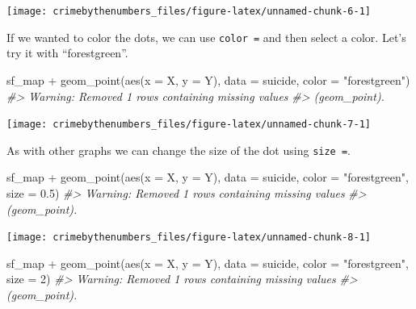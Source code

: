 \documentclass[
]{krantz}
\makeatletter
\newenvironment{Shaded}{\begin{snugshade}}{\end{snugshade}}
\newcommand{\AttributeTok}[1]{\textcolor[rgb]{0.61,0.61,0.61}{#1}}
\newcommand{\CommentTok}[1]{\textcolor[rgb]{0.37,0.37,0.37}{\textit{#1}}}
\newcommand{\DecValTok}[1]{\textcolor[rgb]{0.06,0.06,0.06}{#1}}
\newcommand{\FloatTok}[1]{\textcolor[rgb]{0.06,0.06,0.06}{#1}}
\newcommand{\FunctionTok}[1]{\textcolor[rgb]{0,0,0}{#1}}
\newcommand{\NormalTok}[1]{#1}
\newcommand{\SpecialCharTok}[1]{\textcolor[rgb]{0,0,0}{#1}}
\newcommand{\StringTok}[1]{\textcolor[rgb]{0.5,0.5,0.5}{#1}}
\newenvironment{kframe}{%
\medskip{}
\setlength{\fboxsep}{.8em}
 \def\at@end@of@kframe{}%
 \ifinner\ifhmode%
  \def\at@end@of@kframe{\end{minipage}}%
  \begin{minipage}{\columnwidth}%
 \fi\fi%
 \def\FrameCommand##1{\hskip\@totalleftmargin \hskip-\fboxsep
 \colorbox{shadecolor}{##1}\hskip-\fboxsep
     \hskip-\linewidth \hskip-\@totalleftmargin \hskip\columnwidth}%
 \MakeFramed {\advance\hsize-\width
   \@totalleftmargin\z@ \linewidth\hsize
   \@setminipage}}%
 {\par\unskip\endMakeFramed%
 \at@end@of@kframe}
\renewenvironment{Shaded}{\begin{kframe}}{\end{kframe}}
\makeatother
\begin{document}
\begin{center}\texttt{[image: crimebythenumbers\_files/figure-latex/unnamed-chunk-6-1]} \end{center}

If we wanted to color the dots, we can use \texttt{color\ =} and then select a color. Let's try it with ``forestgreen''.

\begin{Shaded}
\begin{Highlighting}[]
\NormalTok{sf\_map }\SpecialCharTok{+}
  \FunctionTok{geom\_point}\NormalTok{(}\FunctionTok{aes}\NormalTok{(}\AttributeTok{x =}\NormalTok{ X, }\AttributeTok{y =}\NormalTok{ Y),}
             \AttributeTok{data  =}\NormalTok{ suicide,}
             \AttributeTok{color =} \StringTok{"forestgreen"}\NormalTok{)}
\CommentTok{\#\textgreater{} Warning: Removed 1 rows containing missing values}
\CommentTok{\#\textgreater{} (geom\_point).}
\end{Highlighting}
\end{Shaded}

\begin{center}\texttt{[image: crimebythenumbers\_files/figure-latex/unnamed-chunk-7-1]} \end{center}

As with other graphs we can change the size of the dot using \texttt{size\ =}.

\begin{Shaded}
\begin{Highlighting}[]
\NormalTok{sf\_map }\SpecialCharTok{+}
  \FunctionTok{geom\_point}\NormalTok{(}\FunctionTok{aes}\NormalTok{(}\AttributeTok{x =}\NormalTok{ X, }\AttributeTok{y =}\NormalTok{ Y),}
             \AttributeTok{data  =}\NormalTok{ suicide,}
             \AttributeTok{color =} \StringTok{"forestgreen"}\NormalTok{,}
             \AttributeTok{size  =} \FloatTok{0.5}\NormalTok{)}
\CommentTok{\#\textgreater{} Warning: Removed 1 rows containing missing values}
\CommentTok{\#\textgreater{} (geom\_point).}
\end{Highlighting}
\end{Shaded}

\begin{center}\texttt{[image: crimebythenumbers\_files/figure-latex/unnamed-chunk-8-1]} \end{center}

\begin{Shaded}
\begin{Highlighting}[]
\NormalTok{sf\_map }\SpecialCharTok{+}
  \FunctionTok{geom\_point}\NormalTok{(}\FunctionTok{aes}\NormalTok{(}\AttributeTok{x =}\NormalTok{ X, }\AttributeTok{y =}\NormalTok{ Y),}
             \AttributeTok{data  =}\NormalTok{ suicide,}
             \AttributeTok{color =} \StringTok{"forestgreen"}\NormalTok{,}
             \AttributeTok{size  =} \DecValTok{2}\NormalTok{)}
\CommentTok{\#\textgreater{} Warning: Removed 1 rows containing missing values}
\CommentTok{\#\textgreater{} (geom\_point).}
\end{Highlighting}
\end{Shaded}
\end{document}
